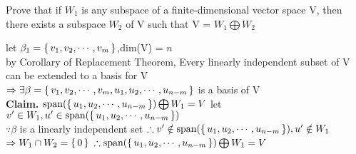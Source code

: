 Prove that if $W_1$ is any subspace of a finite-dimensional vector space V, then there exists a subspace $W_2$ of V such that V = $W_1 \bigoplus W_2$

\begin{tcolorbox}
	\begin{solution}
		let $\beta_1 = \left\{ \,v_1,v_2,\cdots,v_m \,\right\}$,dim(V) = $n$\\
		by Corollary of Replacement Theorem, Every linearly independent subset of V can be extended to a basis for V\\
		$\Rightarrow \exists \beta = \left\{ \,v_1,v_2,\cdots,v_m,u_1,u_2,\cdots,u_{n-m} \,\right\}$ is a basis of V\\
		\textbf{Claim.} $\text{span($\left\{ \,u_1,u_2,\cdots,u_{n-m} \,\right\}$)} \bigoplus W_1 = V$
		let $v' \in W_1, u' \in \text{span($\left\{ \,u_1,u_2,\cdots,u_{n-m} \,\right\}$)} $\\
		$\because \beta$ is a linearly independent set
		$\therefore v' \notin \text{span($\left\{ \,u_1,u_2,\cdots,u_{n-m} \,\right\}$)}, u' \notin W_1$\\
		$\Rightarrow W_1 \cap W_2 = \left\{ \,0 \,\right\}$
		$\therefore \text{span($\left\{ \,u_1,u_2,\cdots,u_{n-m} \,\right\}$)} \bigoplus W_1 = V$
	\end{solution}
\end{tcolorbox}
